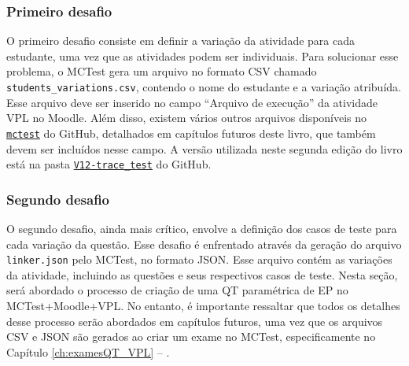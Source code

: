 \subsubsection{Primeiro desafio}

O primeiro desafio consiste em definir a variação da atividade para cada estudante, uma vez que as atividades podem ser individuais. Para solucionar esse problema, o MCTest gera um arquivo no formato CSV chamado \verb|students_variations.csv|, contendo o nome do estudante e a variação atribuída. Esse arquivo deve ser inserido no campo ``Arquivo de execução'' da atividade VPL no Moodle. Além disso, existem vários outros arquivos disponíveis no \href{https://github.com/fzampirolli/mctest}{\texttt{mctest}} do GitHub, detalhados em capítulos futuros deste livro, que também devem ser incluídos nesse campo. A versão utilizada neste segunda edição do livro está na pasta \href{https://github.com/fzampirolli/mctest/tree/master/VPL_modification/V12-trace_test}{\texttt{V12-trace\_test}} do GitHub.


\subsubsection{Segundo desafio}

O segundo desafio, ainda mais crítico, envolve a definição dos casos de teste para cada variação da questão. Esse desafio é enfrentado através da geração do arquivo \verb|linker.json| pelo MCTest, no formato JSON. Esse arquivo contém as variações da atividade, incluindo as questões e seus respectivos casos de teste. Nesta seção, será abordado o processo de criação de uma QT paramétrica de EP no MCTest+Moodle+VPL. No entanto, é importante ressaltar que todos os detalhes desse processo serão abordados em capítulos futuros, uma vez que os arquivos CSV e JSON são gerados ao criar um exame no MCTest, especificamente no Capítulo \ref{ch:examesQT_VPL} -- .


